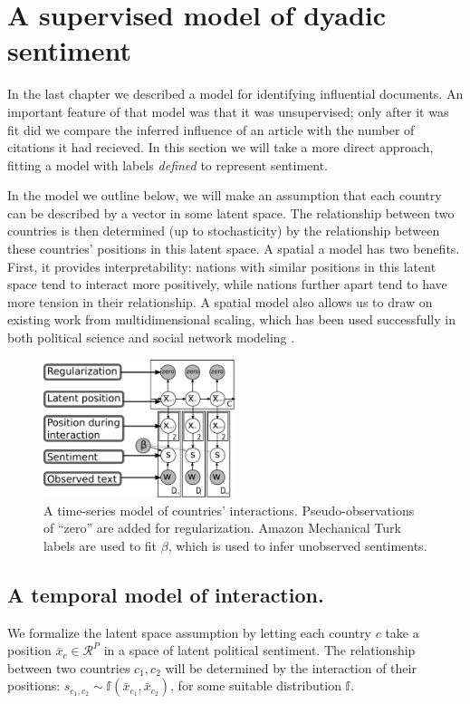 \section{A supervised model of dyadic sentiment}
\label{section:foreign_relations_supervised_model}

In the last chapter we described a model for identifying influential
documents.  An important feature of that model was that it was
unsupervised; only after it was fit did we compare the inferred
influence of an article with the number of citations it had recieved.
In this section we will take a more direct approach, fitting a
model with labels \emph{defined} to represent sentiment.


In the model we outline below, we will make an assumption that each
country can be described by a vector in some latent space.  The
relationship between two countries is then determined (up to
stochasticity) by the relationship between these countries' positions
in this latent space. A spatial a model has two
benefits. First, it provides interpretability: nations with similar
positions in this latent space tend to interact more positively, while
nations further apart tend to have more tension in their relationship.
A spatial model also allows us to draw on existing work from
multidimensional scaling, which has been used successfully in both
political science \cite{martin:2002,jackman:2001} and social network
modeling \cite{hoff:2002,chang:2009}.

\begin{figure}
  \center
  \vspace{-55pt}
  \includegraphics[width=0.5\textwidth]{chapter_foreign_relations/figures/countries_gm.pdf}
  \caption{A time-series model of countries' interactions.
    Pseudo-observations of ``zero'' are added for regularization.
    Amazon Mechanical Turk labels are used to fit $\beta$, which is
    used to infer unobserved sentiments.}
  \label{figure:gm}
\end{figure}

\subsection{A temporal model of interaction.}
We formalize the latent space assumption by letting each country $c$
take a position $\bar x_c \in \mathcal{R}^P$ in a space of latent
political sentiment. The relationship between two countries $c_1, c_2$
will be determined by the interaction of their positions: $s_{c_1, c_2} \sim \mathbb{f}(\bar x_{c_1}, \bar x_{c_2})$, for some suitable distribution $\mathbb{f}$.

